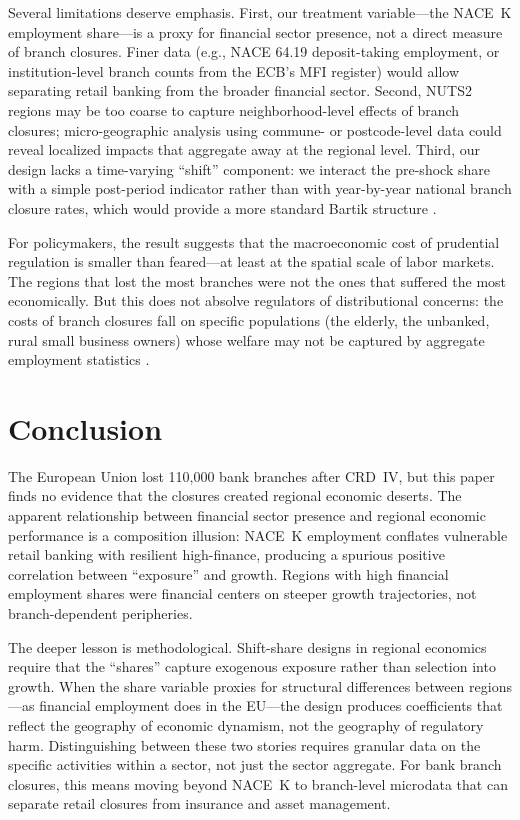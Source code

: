 \documentclass[12pt]{article}
\begin{document}
Several limitations deserve emphasis. First, our treatment variable---the NACE~K employment share---is a proxy for financial sector presence, not a direct measure of branch closures. Finer data (e.g., NACE 64.19 deposit-taking employment, or institution-level branch counts from the ECB's MFI register) would allow separating retail banking from the broader financial sector. Second, NUTS2 regions may be too coarse to capture neighborhood-level effects of branch closures; micro-geographic analysis using commune- or postcode-level data could reveal localized impacts that aggregate away at the regional level. Third, our design lacks a time-varying ``shift'' component: we interact the pre-shock share with a simple post-period indicator rather than with year-by-year national branch closure rates, which would provide a more standard Bartik structure \citep{borusyak2022shifshare}.

For policymakers, the result suggests that the macroeconomic cost of prudential regulation is smaller than feared---at least at the spatial scale of labor markets. The regions that lost the most branches were not the ones that suffered the most economically. But this does not absolve regulators of distributional concerns: the costs of branch closures fall on specific populations (the elderly, the unbanked, rural small business owners) whose welfare may not be captured by aggregate employment statistics \citep{admati2014bankersclothes, dagher2020regulatorycosts}.

\section{Conclusion}

The European Union lost 110,000 bank branches after CRD~IV, but this paper finds no evidence that the closures created regional economic deserts. The apparent relationship between financial sector presence and regional economic performance is a composition illusion: NACE~K employment conflates vulnerable retail banking with resilient high-finance, producing a spurious positive correlation between ``exposure'' and growth. Regions with high financial employment shares were financial centers on steeper growth trajectories, not branch-dependent peripheries.

The deeper lesson is methodological. Shift-share designs in regional economics require that the ``shares'' capture exogenous exposure rather than selection into growth. When the share variable proxies for structural differences between regions---as financial employment does in the EU---the design produces coefficients that reflect the geography of economic dynamism, not the geography of regulatory harm. Distinguishing between these two stories requires granular data on the specific activities within a sector, not just the sector aggregate. For bank branch closures, this means moving beyond NACE~K to branch-level microdata that can separate retail closures from insurance and asset management.
\end{document}

